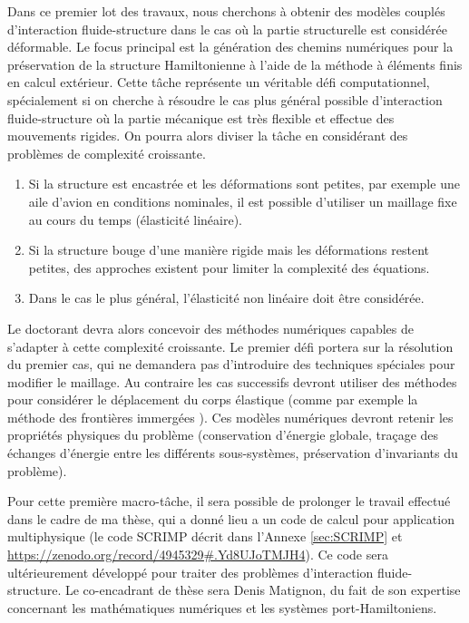 \documentclass[12pt, french]{article}
\begin{document}
	Dans ce premier lot des travaux, nous cherchons à obtenir des modèles couplés d'interaction fluide-structure dans le cas où la partie structurelle est considérée déformable. Le focus principal est la génération des chemins numériques pour la préservation de la structure Hamiltonienne à l'aide de la méthode à éléments finis en calcul extérieur. Cette t\^ache représente un véritable défi computationnel, spécialement si on cherche à résoudre le cas plus général possible d'interaction fluide-structure où la partie mécanique est très flexible et effectue des mouvements rigides. On pourra alors diviser la t\^{a}che en considérant des problèmes de complexité croissante. 
	\begin{enumerate}
		\item Si la structure est encastrée et les déformations sont petites, par exemple une aile d'avion en conditions nominales, il est possible d'utiliser un maillage fixe au cours du temps (élasticité linéaire). 
		\item Si la structure bouge d'une manière rigide mais les déformations restent petites, des approches existent pour limiter la complexité des équations.
		\item Dans le cas le plus général, l'élasticité non linéaire doit être considérée.
	\end{enumerate}
	Le doctorant devra alors concevoir des méthodes numériques capables de s'adapter à cette complexité croissante. Le premier défi portera sur la résolution du premier cas, qui ne demandera pas d'introduire des techniques spéciales pour modifier le maillage. Au contraire les cas successifs devront utiliser des méthodes pour considérer le déplacement du corps élastique (comme par exemple la méthode des frontières immergées \cite{peskin2002}). Ces modèles numériques devront retenir les propriétés physiques du problème (conservation d'énergie globale, traçage des échanges d'énergie entre les différents sous-systèmes, préservation d'invariants du problème).
	
	Pour cette première macro-tâche, il sera possible de prolonger le travail effectué dans le cadre de ma thèse, qui a donn\'e lieu a un code de calcul pour application multiphysique (le code SCRIMP décrit dans l'Annexe \ref{sec:SCRIMP} et \url{https://zenodo.org/record/4945329#.Yd8UJoTMJH4}). Ce code sera ultérieurement développé pour traiter des problèmes d'interaction fluide-structure. Le co-encadrant de thèse sera Denis Matignon, du fait de son expertise concernant les mathématiques numériques et les systèmes port-Hamiltoniens.
	
\end{document}
